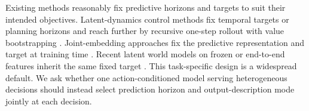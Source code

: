 Existing methods reasonably fix predictive horizons and targets to suit their intended objectives. Latent-dynamics control methods fix temporal targets or planning horizons and reach further by recursive one-step rollout with value bootstrapping \citep{hafner2020dreamer,hansen2022tdmpc}. Joint-embedding approaches fix the predictive representation and target at training time \citep{assran2023ijepa,bardes2024vjepa}. Recent latent world models on frozen or end-to-end features inherit the same fixed target \citep{zhou2025dinowm,maes2026leworldmodel}. This task-specific design is a widespread default. We ask whether one action-conditioned model serving heterogeneous decisions should instead select prediction horizon and output-description mode jointly at each decision.

